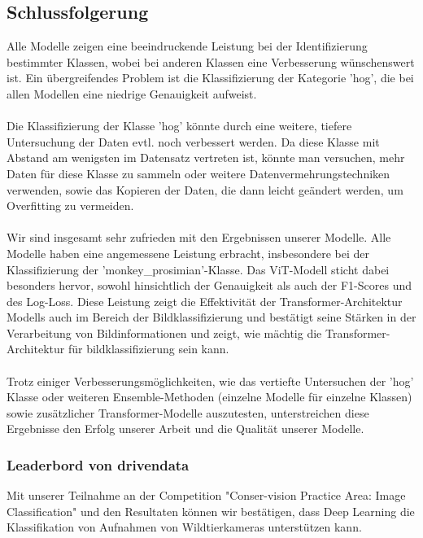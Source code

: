 \documentclass{article}
\begin{document}
\subsection{Schlussfolgerung}
Alle Modelle zeigen eine beeindruckende Leistung bei der Identifizierung bestimmter Klassen, wobei bei anderen Klassen eine Verbesserung wünschenswert ist. Ein übergreifendes Problem ist die Klassifizierung der Kategorie 'hog', die bei allen Modellen eine niedrige Genauigkeit aufweist.\\\\
Die Klassifizierung der Klasse 'hog' könnte durch eine weitere, tiefere Untersuchung der Daten evtl. noch verbessert werden. Da diese Klasse mit Abstand am wenigsten im Datensatz vertreten ist, könnte man versuchen, mehr Daten für diese Klasse zu sammeln oder weitere Datenvermehrungstechniken verwenden, sowie das Kopieren der Daten, die dann leicht geändert werden, um Overfitting zu vermeiden.\\\\
Wir sind insgesamt sehr zufrieden mit den Ergebnissen unserer Modelle. Alle Modelle haben eine angemessene Leistung erbracht, insbesondere bei der Klassifizierung der 'monkey\_prosimian'-Klasse. Das ViT-Modell sticht dabei besonders hervor, sowohl hinsichtlich der Genauigkeit als auch der F1-Scores und des Log-Loss. Diese Leistung zeigt die Effektivität der Transformer-Architektur Modells auch im Bereich der Bildklassifizierung und bestätigt seine Stärken in der Verarbeitung von Bildinformationen und zeigt, wie mächtig die Transformer-Architektur für bildklassifizierung sein kann.\\\\
Trotz einiger Verbesserungsmöglichkeiten, wie das vertiefte Untersuchen der 'hog' Klasse oder weiteren Ensemble-Methoden (einzelne Modelle für einzelne Klassen) sowie zusätzlicher Transformer-Modelle auszutesten, unterstreichen diese Ergebnisse den Erfolg unserer Arbeit und die Qualität unserer Modelle.

\subsubsection{Leaderbord von drivendata}
Mit unserer Teilnahme an der Competition "Conser-vision Practice Area: Image Classification" und den Resultaten können wir bestätigen, dass Deep Learning die Klassifikation von Aufnahmen von Wildtierkameras unterstützen kann.
\end{document}
